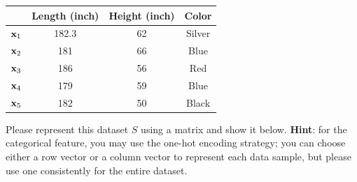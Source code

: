 \documentclass[12pt]{article}%
\begin{document}
\begin{table}[!h]
\begin{center}
\begin{tabular}{l|||c|c|c|}
 & Length (inch) & Height (inch) & Color \\
\hline
${\bf x}_1$ & 182.3 & 62 & Silver \\
 \hline
 ${\bf x}_2$ & 181 & 66 & Blue  \\
  \hline
${\bf x}_3$ & 186 & 56 & Red  \\
  \hline
 ${\bf x}_4$ & 179 & 59 & Blue  \\
  \hline
 ${\bf x}_5$  & 182 & 50 & Black  \\
\hline
\end{tabular}
\end{center}
\end{table}
Please represent this dataset $S$ using a matrix and show it below. 
{\bf Hint}: for the categorical feature, you may use the one-hot encoding strategy; you can choose either a row vector or a column vector to represent each data sample, but please use one consistently for the entire dataset.

\vspace{50mm}
\end{document}
